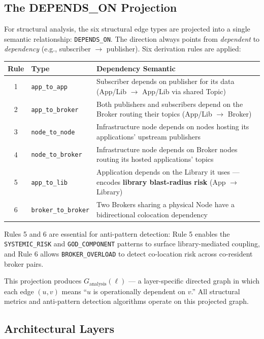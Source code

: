 \documentclass[11pt]{article}
\begin{document}
\subsection{The DEPENDS\_ON Projection}

For structural analysis, the six structural edge types are projected into a single semantic relationship: \texttt{DEPENDS\_ON}. The direction always points from \emph{dependent} to \emph{dependency} (e.g., subscriber $\to$ publisher). Six derivation rules are applied:

\begin{center}
\begin{tabular}{@{}clp{7.5cm}@{}}
\toprule
\textbf{Rule} & \textbf{Type} & \textbf{Dependency Semantic} \\
\midrule
1 & \texttt{app\_to\_app} & Subscriber depends on publisher for its data (App/Lib $\to$ App/Lib via shared Topic) \\
2 & \texttt{app\_to\_broker} & Both publishers and subscribers depend on the Broker routing their topics (App/Lib $\to$ Broker) \\
3 & \texttt{node\_to\_node} & Infrastructure node depends on nodes hosting its applications' upstream publishers \\
4 & \texttt{node\_to\_broker} & Infrastructure node depends on Broker nodes routing its hosted applications' topics \\
5 & \texttt{app\_to\_lib} & Application depends on the Library it uses --- encodes \textbf{library blast-radius risk} (App $\to$ Library) \\
6 & \texttt{broker\_to\_broker} & Two Brokers sharing a physical Node have a bidirectional colocation dependency \\
\bottomrule
\end{tabular}
\end{center}

Rules 5 and 6 are essential for anti-pattern detection: Rule 5 enables the \texttt{SYSTEMIC\_RISK} and \texttt{GOD\_COMPONENT} patterns to surface library-mediated coupling, and Rule 6 allows \texttt{BROKER\_OVERLOAD} to detect co-location risk across co-resident broker pairs.

This projection produces $G_{\text{analysis}}(\ell)$ --- a layer-specific directed graph in which each edge $(u,v)$ means ``$u$ is operationally dependent on $v$.'' All structural metrics and anti-pattern detection algorithms operate on this projected graph.

\subsection{Architectural Layers}
\end{document}

